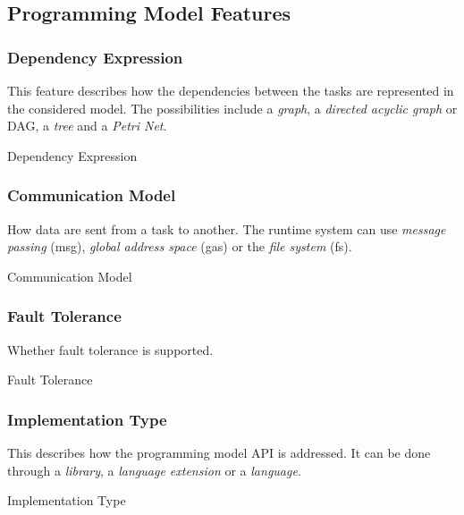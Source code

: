 \subsection{Programming Model Features}
\subsubsection{Dependency Expression}
This feature describes how the dependencies between the tasks are represented in the considered model.
The possibilities include a \textit{graph}, a \textit{directed acyclic graph} or DAG, a \textit{tree} and a \textit{Petri Net}.
\begin{table}[H]
	\caption{Dependency Expression}
	\centering
	
\end{table}


\subsubsection{Communication Model}
How data are sent from a task to another.
The runtime system can use \textit{message passing} (msg), \textit{global address space} (gas) or the \textit{file system} (fs).
\begin{table}[H]
	\caption{Communication Model}
	\centering
	
\end{table}

\subsubsection{Fault Tolerance}
Whether fault tolerance is supported.
\begin{table}[H]
	\caption{Fault Tolerance}
	\centering
	
\end{table}

\subsubsection{Implementation Type}
This describes how the programming model API is addressed.
It can be done through a \textit{library}, a \textit{language extension} or a \textit{language}.
\begin{table}[H]
	\caption{Implementation Type}
	\centering
	
\end{table}

